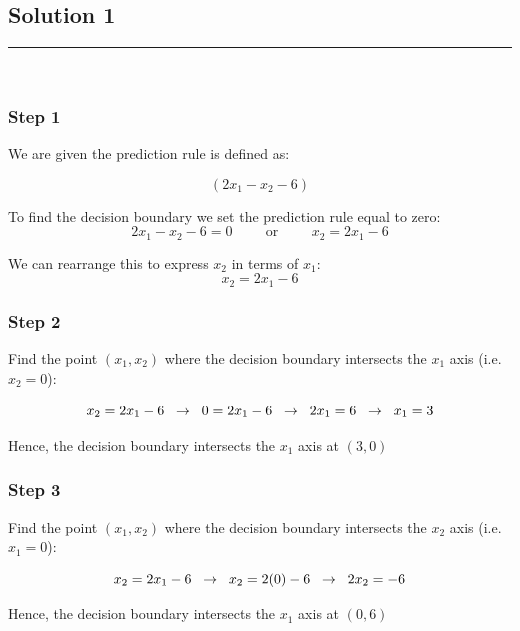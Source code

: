 \documentclass{article}
\begin{document}
\pagestyle{fancy}

\subsection*{Solution 1}
\noindent\rule{\textwidth}{0.4pt}\\

\subsubsection*{Step 1}
\parbox{\textwidth}{
We are given the prediction rule is defined as:
} 

$$\left(2 x_{1}-x_{2}-6\right)$$

To find the decision boundary we set the prediction rule equal to zero:
$$2 x_{1}-x_{2}-6 = 0 \hspace{1cm} \text{or} \hspace{1cm} x_{2} = 2 x_{1} - 6$$

We can rearrange this to express $x_2$ in terms of $x_1$:
$$x_{2} = 2 x_{1} - 6$$

\subsubsection*{Step 2}
\parbox{\textwidth}{
Find the point $(x_{1},x_{2})$ where the decision boundary intersects the $x_{1}$ axis (i.e. $x_{2}=0$):

$$x_{2} = 2 x_{1} - 6 \hspace{0.2cm} \rightarrow \hspace{0.2cm} 0 = 2 x_{1} - 6 \hspace{0.2cm} \rightarrow \hspace{0.2cm} 2 x_{1} = 6 \hspace{0.2cm} \rightarrow \hspace{0.2cm} x_{1} = 3$$

Hence, the decision boundary intersects the $x_{1}$ axis at $(3,0)$
}
\subsubsection*{Step 3}
\parbox{\textwidth}{
Find the point $(x_{1},x_{2})$ where the decision boundary intersects the $x_{2}$ axis (i.e. $x_{1}=0$):

$$x_{2} = 2 x_{1} - 6 \hspace{0.2cm} \rightarrow \hspace{0.2cm} x_{2} = 2 (0) - 6 \hspace{0.2cm} \rightarrow \hspace{0.2cm} 2 x_{2} = -6 $$

Hence, the decision boundary intersects the $x_{1}$ axis at $(0,6)$
}
\end{document}
